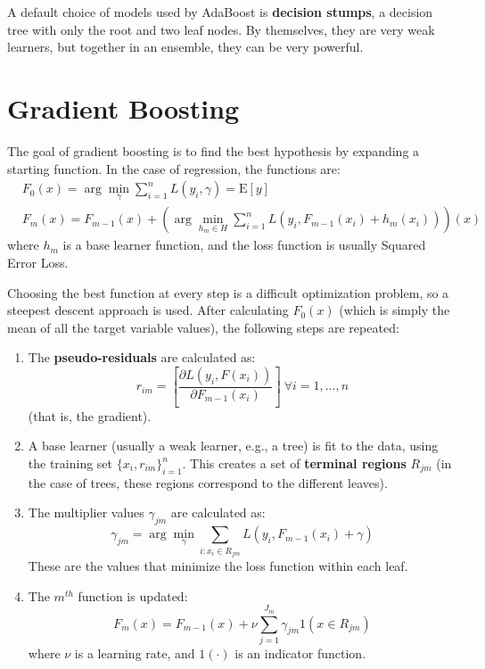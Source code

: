 A default choice of models used by AdaBoost is \textbf{decision stumps}, a decision tree with only the root and two leaf nodes. By themselves, they are very weak learners, but together in an ensemble, they can be very powerful.

\section{Gradient Boosting}

The goal of gradient boosting is to find the best hypothesis by expanding a starting function. In the case of regression, the functions are:
\begin{align*}
    &F_0(x) = \arg \min_{\gamma} \sum_{i=1}^n L(y_i, \gamma) = \mathrm{E}[y] \\
    &F_m(x) = F_{m-1}(x) + \left ( \arg \min_{h_m \in H} \sum_{i=1}^n L(y_i, F_{m-1}(x_i) + h_m(x_i)) \right ) (x)
\end{align*}
where $h_m$ is a base learner function, and the loss function is usually Squared Error Loss.

Choosing the best function at every step is a difficult optimization problem, so a steepest descent approach is used. After calculating $F_0(x)$ (which is simply the mean of all the target variable values), the following steps are repeated:
\begin{enumerate}
    \item The \textbf{pseudo-residuals} are calculated as:
    \begin{equation*}
        r_{im} = \left [ \dfrac{\partial L(y_i, F(x_i))}{\partial F_{m-1}(x_i)} \right ] \ \forall i = 1, \dots, n
    \end{equation*}
    (that is, the gradient).

    \item A base learner (usually a weak learner, e.g., a tree) is fit to the data, using the training set $\{x_i, r_{im}\}_{i=1}^n$. This creates a set of \textbf{terminal regions} $R_{jm}$ (in the case of trees, these regions correspond to the different leaves).

    \item The multiplier values $\gamma_{jm}$ are calculated as:
    \begin{equation*}
        \gamma_{jm} = \arg \min_{\gamma} \sum_{i:x_i \in R_{jm}} L(y_i, F_{m-1}(x_i) + \gamma)
    \end{equation*}
    These are the values that minimize the loss function within each leaf.

    \item The $m^{th}$ function is updated:
    \begin{equation*}
        F_m(x) = F_{m-1}(x) + \nu \sum_{j=1}^{J_m} \gamma_{jm} 1(x \in R_{jm}) 
    \end{equation*}
    where $\nu$ is a learning rate, and $1(\cdot)$ is an indicator function.
\end{enumerate}

